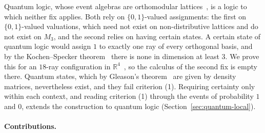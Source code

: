 Quantum logic, whose event algebras are orthomodular
lattices~\cite{birkhoff-vonneumann1936}, is a logic to which neither fix
applies. Both rely on $\{0,1\}$-valued assignments: the first on
$\{0,1\}$-valued valuations, which need not exist on non-distributive
lattices and do not exist on $M_3$, and the second relies on having certain states. A certain
state of quantum logic would assign $1$ to exactly one ray of every
orthogonal basis, and by the Kochen--Specker
theorem~\cite{kochen-specker1967} there is none in dimension at least
$3$. We prove this for an $18$-ray configuration in
$\mathbb{R}^4$~\cite{cabello1996}, so the calculus of the second fix is
empty there. Quantum states, which by Gleason's
theorem~\cite{gleason1957} are given by density matrices, nevertheless
exist, and they fail criterion (1). Requiring certainty only within each
context, and reading criterion (1) through the events of probability $1$
and $0$, extends the construction to quantum logic
(Section~\ref{sec:quantum-local}).


\paragraph{Contributions.}

